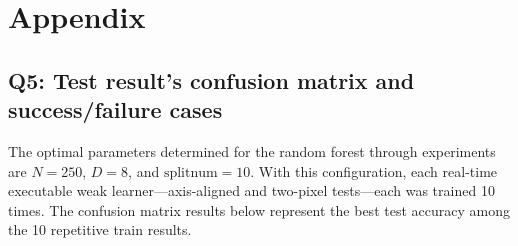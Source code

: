 \section{Appendix}

\subsection{Q5: Test result's confusion matrix and success/failure cases }
\label{subsec:Q5-1}
The optimal parameters determined for the random forest through experiments are $N=250$, $D=8$, and $\text{splitnum}=10$. With this configuration, each real-time executable weak learner—axis-aligned and two-pixel tests—each was trained 10 times. The confusion matrix results below represent the best test accuracy among the 10 repetitive train results.

